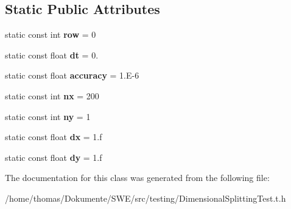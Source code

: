 \subsection*{Static Public Attributes}
\begin{DoxyCompactItemize}
\item 
\hypertarget{classDimensionalSplittingTest_ad92c582ea8da6ba339580e49c9c5e5e5}{static const int {\bfseries row} = 0}\label{classDimensionalSplittingTest_ad92c582ea8da6ba339580e49c9c5e5e5}

\item 
\hypertarget{classDimensionalSplittingTest_a6fe5e4aaa4549d82c81a784f48848b91}{static const float {\bfseries dt} = 0.}\label{classDimensionalSplittingTest_a6fe5e4aaa4549d82c81a784f48848b91}

\item 
\hypertarget{classDimensionalSplittingTest_a6c59aeb28bf9e35cfc1fffd637b63a3a}{static const float {\bfseries accuracy} = 1.\-E-\/6}\label{classDimensionalSplittingTest_a6c59aeb28bf9e35cfc1fffd637b63a3a}

\item 
\hypertarget{classDimensionalSplittingTest_a4c133bac73b26d87b8cab48611f4f006}{static const int {\bfseries nx} = 200}\label{classDimensionalSplittingTest_a4c133bac73b26d87b8cab48611f4f006}

\item 
\hypertarget{classDimensionalSplittingTest_a44c2e930d72dd4e02d2b9d39203a078b}{static const int {\bfseries ny} = 1}\label{classDimensionalSplittingTest_a44c2e930d72dd4e02d2b9d39203a078b}

\item 
\hypertarget{classDimensionalSplittingTest_abcc06ad547cd6f49fb1b49c4aa017044}{static const float {\bfseries dx} = 1.f}\label{classDimensionalSplittingTest_abcc06ad547cd6f49fb1b49c4aa017044}

\item 
\hypertarget{classDimensionalSplittingTest_ac07c652a660b200b18c4d557953dd78f}{static const float {\bfseries dy} = 1.f}\label{classDimensionalSplittingTest_ac07c652a660b200b18c4d557953dd78f}

\end{DoxyCompactItemize}


The documentation for this class was generated from the following file\-:\begin{DoxyCompactItemize}
\item 
/home/thomas/\-Dokumente/\-S\-W\-E/src/testing/Dimensional\-Splitting\-Test.\-t.\-h\end{DoxyCompactItemize}
